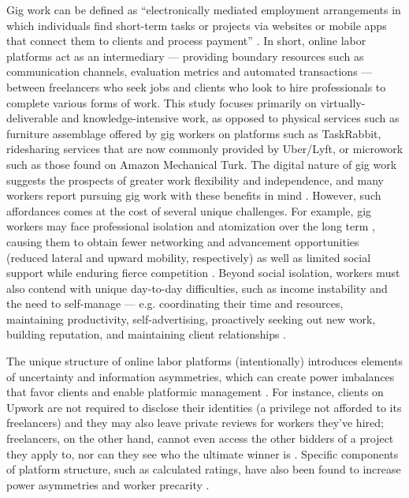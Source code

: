 Gig work can be defined as ``electronically mediated employment arrangements in which individuals find short-term tasks or projects via websites or mobile apps that connect them to clients and process payment'' \cite{kuhn2019expanding}. 
{In short, online labor platforms act as an intermediary --- providing boundary resources such as communication channels, evaluation metrics and automated transactions \cite{platform_manage} --- between freelancers who seek jobs and clients who look to hire professionals to complete various forms of work.} 
{ This study focuses primarily on virtually-deliverable and knowledge-intensive work, as opposed to physical services such as furniture assemblage offered by gig workers on platforms such as TaskRabbit, ridesharing services that are now commonly provided by Uber/Lyft, or microwork such as those found on Amazon Mechanical Turk.} 
The digital nature of gig work {suggests} the prospect{s} of greater work flexibility and independence, and many workers report pursuing gig work with these benefits in mind \cite{Hall2018-uo}. However, {such affordances} comes at the cost of several unique challenges. For example, gig workers may face professional isolation and atomization over the long term {\cite{atom}}, {causing them to} obtain fewer networking and {advancement} opportunities (reduced lateral {and upward} mobility{, respectively}) { as well as limited social support while enduring fierce competition} \cite{boundary}. 
{Beyond social isolation,} workers must also contend with unique day-to-day difficulties, such as income instability and the need to self-manage --- e.g. coordinating their time and resources, {maintaining productivity,} self-advertising, proactively seeking out new work, {building reputation,} and maintaining client relationships {\cite{precarity}}.

{The unique structure of online labor platforms (intentionally) introduces elements of uncertainty and information asymmetries, which can create power imbalances that favor clients and enable platformic management \cite{platform_manage, power, power_struggles, precarity, Jarrahi_Sutherland_2019, kingsley2015accounting}. For instance, clients on Upwork are not required to disclose their identities (a privilege not afforded to its freelancers) and they may also leave private reviews for workers they've hired; freelancers, on the other hand, cannot even access the other bidders of a project they apply to, nor can they see who the ultimate winner is \cite{platform_manage}. Specific components of platform structure, such as calculated ratings, have also been found to increase power asymmetries and worker precarity \cite{precarity}.} 

